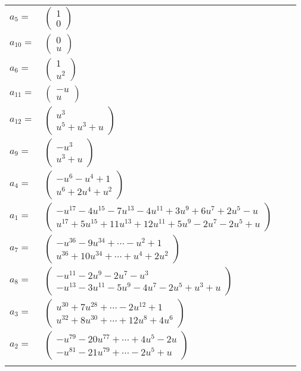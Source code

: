 \documentclass[1p]{elsarticle_modified}
\theoremstyle{definition}
\begin{document}
\begin{tabular}{m{7pt} m{180pt} m{7pt} m{180pt} }
\flushright $a_{5}=$&$\begin{pmatrix}1\\0\end{pmatrix}$ \\
\flushright $a_{10}=$&$\begin{pmatrix}0\\u\end{pmatrix}$ \\
\flushright $a_{6}=$&$\begin{pmatrix}1\\u^2\end{pmatrix}$ \\
\flushright $a_{11}=$&$\begin{pmatrix}- u\\u\end{pmatrix}$ \\
\flushright $a_{12}=$&$\begin{pmatrix}u^3\\u^5+u^3+u\end{pmatrix}$ \\
\flushright $a_{9}=$&$\begin{pmatrix}- u^3\\u^3+u\end{pmatrix}$ \\
\flushright $a_{4}=$&$\begin{pmatrix}- u^6- u^4+1\\u^6+2 u^4+u^2\end{pmatrix}$ \\
\flushright $a_{1}=$&$\begin{pmatrix}- u^{17}-4 u^{15}-7 u^{13}-4 u^{11}+3 u^9+6 u^7+2 u^5- u\\u^{17}+5 u^{15}+11 u^{13}+12 u^{11}+5 u^9-2 u^7-2 u^5+u\end{pmatrix}$ \\
\flushright $a_{7}=$&$\begin{pmatrix}- u^{36}-9 u^{34}+\cdots- u^2+1\\u^{36}+10 u^{34}+\cdots+u^4+2 u^2\end{pmatrix}$ \\
\flushright $a_{8}=$&$\begin{pmatrix}- u^{11}-2 u^9-2 u^7- u^3\\- u^{13}-3 u^{11}-5 u^9-4 u^7-2 u^5+u^3+u\end{pmatrix}$ \\
\flushright $a_{3}=$&$\begin{pmatrix}u^{30}+7 u^{28}+\cdots-2 u^{12}+1\\u^{32}+8 u^{30}+\cdots+12 u^8+4 u^6\end{pmatrix}$ \\
\flushright $a_{2}=$&$\begin{pmatrix}- u^{79}-20 u^{77}+\cdots+4 u^5-2 u\\- u^{81}-21 u^{79}+\cdots-2 u^5+u\end{pmatrix}$\\&\end{tabular}
\end{document}
